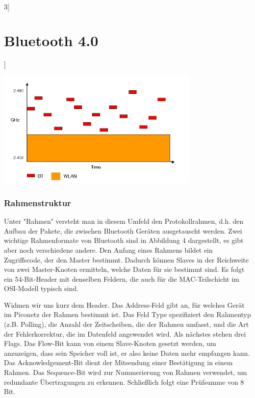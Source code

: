 \begin{multicols}{3}[\section{Bluetooth 4.0}]
\begin{Figure}
\includegraphics[width=\linewidth]{Kapitel/Bluetooth_4/Grafiken/frequenzsprung.png}
\label{fig:vorlage.vorlesungssaal}
\end{Figure}

\subsubsection*{Rahmenstruktur}
Unter "Rahmen" versteht man in diesem Umfeld den Protokollrahmen, d.h. den Aufbau der Pakete, die zwischen Bluetooth Geräten ausgetauscht werden. Zwei wichtige Rahmenformate von Bluetooth sind in Abbildung 4 dargestellt, es gibt aber noch verschiedene andere. Den Anfang eines Rahmens bildet ein Zugriffscode, der den Master bestimmt. Dadurch können Slaves in der Reichweite von zwei Master-Knoten ermitteln, welche Daten für sie bestimmt sind. Es folgt ein 54-Bit-Header mit denselben Feldern, die auch für die MAC-Teilschicht im OSI-Modell typisch sind. 

Widmen wir uns kurz dem Header. Das Address-Feld gibt an, für welches Gerät im Piconetz der Rahmen bestimmt ist. Das Feld Type  spezifiziert den Rahmentyp (z.B. Polling), die Anzahl der Zeitscheiben, die der Rahmen umfasst, und die Art der Fehlerkorrektur, die im Datenfeld angewendet wird. Als nächstes stehen drei Flags. Das Flow-Bit kann von einem Slave-Knoten gesetzt werden, um anzuzeigen, dass sein Speicher voll ist, er also keine Daten mehr empfangen kann. Das Acknowledgement-Bit dient der Mitsendung einer Bestätigung in einem Rahmen. Das Sequence-Bit wird zur Nummerierung von Rahmen verwendet, um redundante Übertragungen zu erkennen. Schließlich folgt eine Prüfsumme von 8 Bit. 


\end{multicols}
